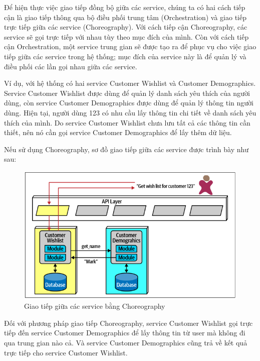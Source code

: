 \par Để hiện thực việc giao tiếp đồng bộ giữa các service, chúng ta có hai cách tiếp cận là giao tiếp thông qua bộ điều phối trung tâm (Orchestration) và giao tiếp trực tiếp giữa các service (Choreography). Với cách tiếp cận Choreography, các service sẽ gọi trực tiếp với nhau tùy theo mục đích của mình. Còn với cách tiếp cận Orchestration, một service trung gian sẽ được tạo ra để phục vụ cho việc giao tiếp giữa các service trong hệ thống; mục đích của service này là để quản lý và điều phối các lần gọi nhau giữa các service. 
\par Ví dụ, với hệ thống có hai service Customer Wishlist và Customer Demographics. Service Customer Wishlist được dùng để quản lý danh sách yêu thích của người dùng, còn service Customer Demographics được dùng để quản lý thông tin người dùng. Hiện tại, người dùng 123 có nhu cầu lấy thông tin chi tiết về danh sách yêu thích của mình. Do service Customer Wishlist chưa lưu tất cả các thông tin cần thiết, nên nó cần gọi service Customer Demographics để lấy thêm dữ liệu.

\par Nếu sử dụng Choreography, sơ đồ giao tiếp giữa các service được trình bày như sau:
\begin{figure}[!htp]
	\centering
	\includegraphics[width=17cm]{img/Architecture/choreography.PNG}
	\newline
	\caption{Giao tiếp giữa các service bằng Choreography \cite{archChoreography}}
\end{figure}
Đối với phương pháp giao tiếp Choreography, service Customer Wishlist gọi trực tiếp đến service Customer Demographics để lấy thông tin từ user mà không đi qua trung gian nào cả. Và service Customer Demographics cũng trả về kết quả trực tiếp cho service Customer Wishlist.

